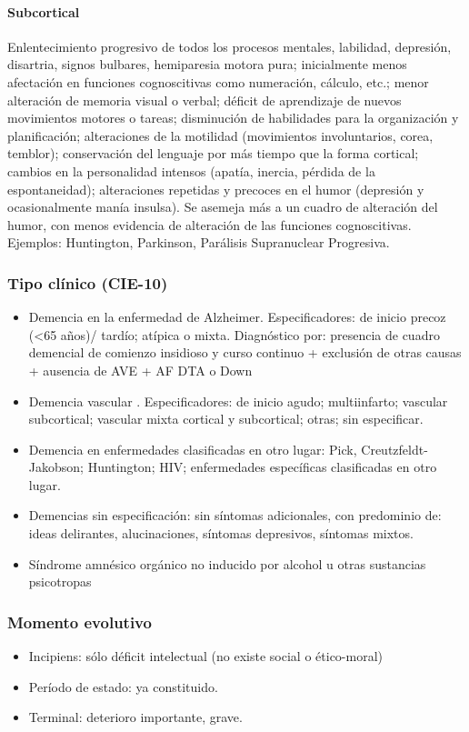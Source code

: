 \paragraph{Subcortical} Enlentecimiento progresivo de todos los procesos mentales, labilidad, depresión, disartria, signos bulbares, hemiparesia motora pura; inicialmente menos afectación en funciones cognoscitivas como numeración, cálculo, etc.; menor alteración de memoria visual o verbal; déficit de aprendizaje de nuevos movimientos motores o tareas; disminución de habilidades para la organización y planificación; alteraciones de la motilidad (movimientos involuntarios, corea, temblor); conservación del lenguaje por más tiempo que la forma cortical; cambios en la personalidad intensos (apatía, inercia, pérdida de la espontaneidad); alteraciones repetidas y precoces en el humor (depresión y ocasionalmente manía insulsa). Se asemeja más a un cuadro de alteración del humor, con menos evidencia de alteración de las funciones cognoscitivas. Ejemplos: Huntington, Parkinson, Parálisis Supranuclear Progresiva.
\subsubsection*{Tipo clínico (CIE-10)}
\begin{itemize}
	\item Demencia en la enfermedad de Alzheimer. Especificadores: de inicio precoz (<65 años)/ tardío; atípica o mixta. Diagnóstico por: presencia de cuadro demencial de comienzo insidioso y curso continuo + exclusión de otras causas + ausencia de AVE + AF DTA o Down
	\item Demencia vascular . Especificadores: de inicio agudo; multiinfarto; vascular subcortical; vascular mixta cortical y subcortical; otras; sin especificar.
	\item Demencia en enfermedades clasificadas en otro lugar: Pick, Creutzfeldt-Jakobson; Huntington; HIV; enfermedades específicas clasificadas en otro lugar.
	\item Demencias sin especificación: sin síntomas adicionales, con predominio de: ideas delirantes, alucinaciones, síntomas depresivos, síntomas mixtos.
	\item Síndrome amnésico orgánico no inducido por alcohol u otras sustancias psicotropas
\end{itemize}
\subsubsection*{Momento evolutivo}
\begin{itemize}
	\item Incipiens: sólo déficit intelectual (no existe social o ético-moral)
	\item Período de estado: ya constituido.
	\item Terminal: deterioro importante, grave.
\end{itemize}
